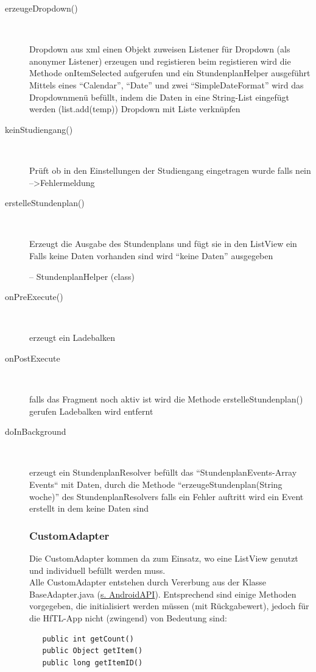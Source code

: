 \begin{description}
\item[erzeugeDropdown()]~\par
Dropdown aus xml einen Objekt zuweisen
Listener für Dropdown (als anonymer Listener) erzeugen und registieren
beim registieren wird die Methode onItemSelected aufgerufen und ein StundenplanHelper ausgeführt
Mittels eines “Calendar”, “Date” und zwei “SimpleDateFormat” wird das Dropdownmenü befüllt, indem die Daten in eine String-List eingefügt werden (list.add(temp))
Dropdown mit Liste verknüpfen
 
\item[keinStudiengang()]~\par
Prüft ob in den Einstellungen der Studiengang eingetragen wurde
falls nein -->Fehlermeldung

\item[erstelleStundenplan()]~\par
Erzeugt die Ausgabe des Stundenplans und fügt sie in den ListView ein
Falls keine Daten vorhanden sind wird “keine Daten” ausgegeben
 
-- StundenplanHelper (class)
 
\item[onPreExecute()]~\par
erzeugt ein Ladebalken
\item[onPostExecute]~\par
falls das Fragment noch aktiv ist wird die Methode erstelleStundenplan() gerufen
Ladebalken wird entfernt
 
\item[doInBackground]~\par
erzeugt ein StundenplanResolver
befüllt das “StundenplanEvents-Array Events“ mit Daten, durch die Methode “erzeugeStundenplan(String woche)” des StundenplanResolvers
falls ein Fehler auftritt wird ein Event erstellt in dem keine Daten sind


\newpage
\subsubsection{CustomAdapter} 
Die CustomAdapter kommen da zum Einsatz, wo eine ListView genutzt und individuell befüllt werden muss. \\
Alle CustomAdapter entstehen durch Vererbung aus der Klasse BaseAdapter.java (\href{http://developer.android.com/reference/android/widget/BaseAdapter.html}{s. AndroidAPI}). Entsprechend sind einige Methoden vorgegeben, die initialisiert werden müssen (mit Rückgabewert), jedoch für die HfTL-App nicht (zwingend) von Bedeutung sind:
\begin{lstlisting}
   public int getCount()
   public Object getItem()
   public long getItemID()
\end{lstlisting}


\end{description}
